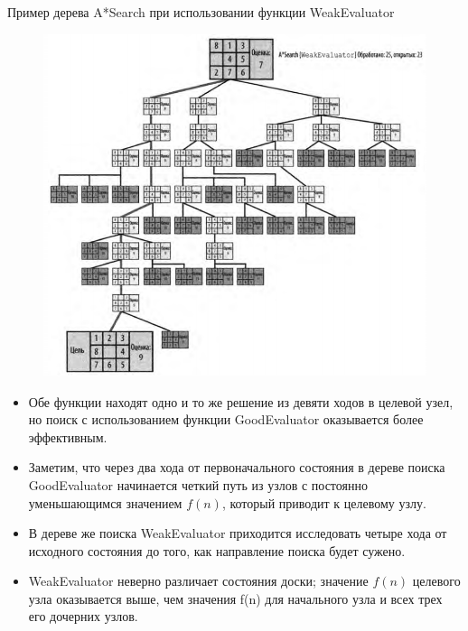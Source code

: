 \documentclass{beamer}
\begin{document}
\begin{frame}
Пример дерева A*Search при использовании функции WeakEvaluator
\begin{figure}[h]
\centering
\includegraphics[scale=0.4]{images/lec06-pic12.png}
\end{figure}
\end{frame}

\begin{frame}
\begin{itemize}
\item Обе функции находят одно и то же решение из девяти ходов в целевой узел, но поиск с использованием функции GoodEvaluator оказывается более эффективным. 
\item Заметим, что через два хода от первоначального состояния в дереве поиска GoodEvaluator начинается четкий путь из узлов с постоянно уменьшающимся значением $f(n)$, который приводит к целевому узлу. 
\item В дереве же поиска WeakEvaluator приходится исследовать четыре хода от исходного состояния до того, как направление поиска будет сужено.
\item WeakEvaluator неверно различает состояния доски; значение $f(n)$ целевого узла оказывается выше, чем значения f(n) для начального узла и всех трех его дочерних узлов.
\end{itemize}
\end{frame}
\end{document}
